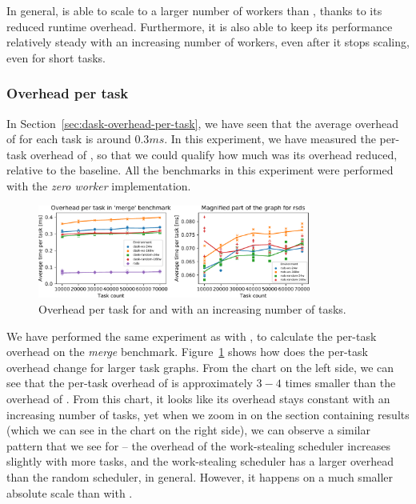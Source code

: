 In general, \rsds{} is able to scale to a larger number of workers than
\dask{}, thanks to its reduced runtime overhead. Furthermore, it is also able
to keep its performance relatively steady with an increasing number of workers, even after it stops
scaling, even for short tasks.

\subsubsection*{Overhead per task}
In Section~\ref{sec:dask-overhead-per-task}, we have seen that the average overhead of
\dask{} for each task is around $0.3ms$. In this experiment,
we have measured the per-task overhead of \rsds{}, so that we could qualify how
much was its overhead reduced, relative to the baseline. All the benchmarks in this experiment were
performed with the \emph{zero worker} implementation.

\begin{figure}
	\centering
	\includegraphics[width=0.8\textwidth]{./imgs/rsds/charts/rsds-merge-task-scaling}
	\caption{Overhead per task for \rsds{} and \dask{} with an
	increasing number of tasks.}
	\label{fig:rsds-merge-task-scaling}
\end{figure}

We have performed the same experiment as with \dask{}, to calculate the
per-task overhead on the \emph{merge} benchmark. Figure~\ref{fig:rsds-merge-task-scaling}
shows how does the per-task overhead change for larger task graphs. From the chart on the left
side, we can see that the per-task overhead of \rsds{} is approximately
$3-4$ times smaller than the overhead of \dask{}. From
this chart, it looks like its overhead stays constant with an increasing number of tasks, yet when
we zoom in on the section containing \rsds{} results (which we can see in the
chart on the right side), we can observe a similar pattern that we see for
\dask{} -- the overhead of the work-stealing scheduler increases slightly with
more tasks, and the work-stealing scheduler has a larger overhead than the random scheduler, in
general. However, it happens on a much smaller absolute scale than with
\dask{}.

